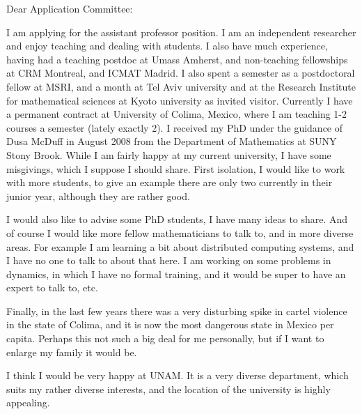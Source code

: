 \documentclass[12pt]{letter}
\date{Fall 2018}
\begin{document}
\begin{letter}{
}
\opening{Dear Application Committee:}   
I am applying for the assistant professor position. I am an independent researcher and enjoy teaching and dealing with students.
I also have much experience, having had a teaching postdoc at Umass Amherst, 
and non-teaching fellowships at CRM Montreal, and ICMAT Madrid. I also spent a semester as a postdoctoral fellow at MSRI, and a
month at Tel Aviv university and at the Research Institute for mathematical
sciences at Kyoto university as invited visitor. Currently I have a permanent contract at University of Colima,  Mexico, where I am teaching 1-2 courses a semester (lately exactly 2).
I received my PhD under the 
guidance of Dusa McDuff
in August 2008 from
the Department of Mathematics at SUNY Stony Brook.  While I am fairly happy at my current university,  
I have some misgivings, which I suppose I should share.
First isolation, I would like to work with more students, to give an example there are only two currently in their junior year, although they are rather good.

I would also like to advise some PhD students, I have many ideas to share. And of course I would like more fellow mathematicians to talk to, and in more diverse areas. For example I am learning a bit about distributed computing systems, and I have no one to talk to about that here. I am working on some problems in dynamics, in which I have no formal training, and it would be super to have an expert to talk to, etc.

Finally, in the last few years there was a very disturbing spike in cartel violence in the state of Colima, and it is now the most dangerous state in Mexico per capita. Perhaps this not such a big deal for me personally, but if I want to enlarge my family it would be.


I think I would be very happy at UNAM.  It is a very diverse department, 
which suits my rather diverse interests,  and the location of the university
is highly appealing. 





\end{letter}
\end{document}
